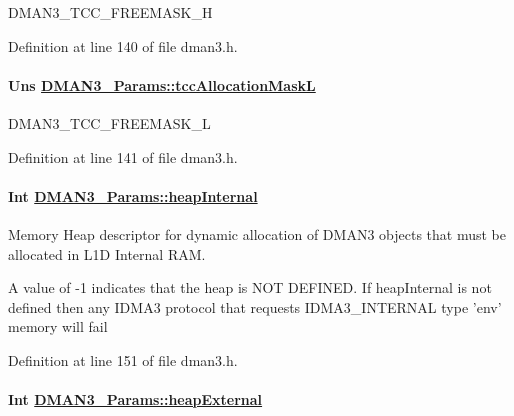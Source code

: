 DMAN3\_\-TCC\_\-FREEMASK\_\-H 

Definition at line 140 of file dman3.h.\hypertarget{struct_d_m_a_n3___params_ce9a03fc79f8cf2727f2753693a66caa}{
\paragraph[tccAllocationMaskL]{\setlength{\rightskip}{0pt plus 5cm}Uns \hyperlink{struct_d_m_a_n3___params_ce9a03fc79f8cf2727f2753693a66caa}{DMAN3\_\-Params::tcc\-Allocation\-Mask\-L}}\hfill}
\label{struct_d_m_a_n3___params_ce9a03fc79f8cf2727f2753693a66caa}


DMAN3\_\-TCC\_\-FREEMASK\_\-L 

Definition at line 141 of file dman3.h.\hypertarget{struct_d_m_a_n3___params_1acba3008b12df10cad8b80bb5991e55}{
\paragraph[heapInternal]{\setlength{\rightskip}{0pt plus 5cm}Int \hyperlink{struct_d_m_a_n3___params_1acba3008b12df10cad8b80bb5991e55}{DMAN3\_\-Params::heap\-Internal}}\hfill}
\label{struct_d_m_a_n3___params_1acba3008b12df10cad8b80bb5991e55}


Memory Heap descriptor for dynamic allocation of DMAN3 objects that must be allocated in L1D Internal RAM.

A value of -1 indicates that the heap is NOT DEFINED. If heap\-Internal is not defined then any IDMA3 protocol that requests IDMA3\_\-INTERNAL type 'env' memory will fail 

Definition at line 151 of file dman3.h.\hypertarget{struct_d_m_a_n3___params_5e397135231bc45e7e3ac6d4e1ae3166}{
\paragraph[heapExternal]{\setlength{\rightskip}{0pt plus 5cm}Int \hyperlink{struct_d_m_a_n3___params_5e397135231bc45e7e3ac6d4e1ae3166}{DMAN3\_\-Params::heap\-External}}\hfill}
\label{struct_d_m_a_n3___params_5e397135231bc45e7e3ac6d4e1ae3166}


